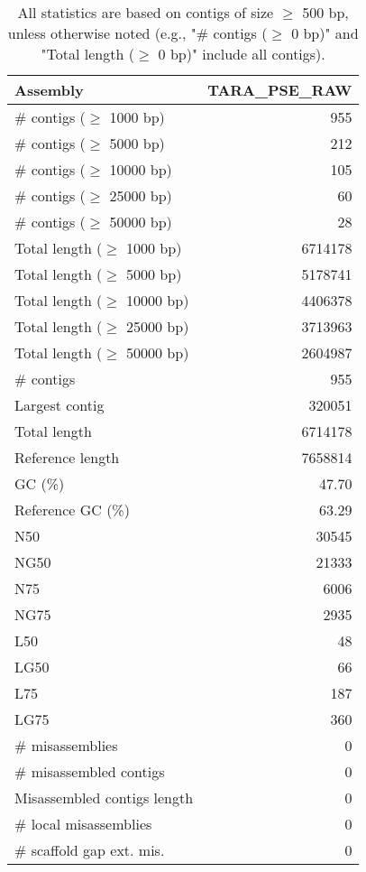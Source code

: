 \documentclass[12pt,a4paper]{article}
\begin{document}
\begin{table}[ht]
\begin{center}
\caption{All statistics are based on contigs of size $\geq$ 500 bp, unless otherwise noted (e.g., "\# contigs ($\geq$ 0 bp)" and "Total length ($\geq$ 0 bp)" include all contigs).}
\begin{tabular}{|l*{1}{|r}|}
\hline
Assembly & TARA\_PSE\_RAW \\ \hline
\# contigs ($\geq$ 1000 bp) & 955 \\ \hline
\# contigs ($\geq$ 5000 bp) & 212 \\ \hline
\# contigs ($\geq$ 10000 bp) & 105 \\ \hline
\# contigs ($\geq$ 25000 bp) & 60 \\ \hline
\# contigs ($\geq$ 50000 bp) & 28 \\ \hline
Total length ($\geq$ 1000 bp) & 6714178 \\ \hline
Total length ($\geq$ 5000 bp) & 5178741 \\ \hline
Total length ($\geq$ 10000 bp) & 4406378 \\ \hline
Total length ($\geq$ 25000 bp) & 3713963 \\ \hline
Total length ($\geq$ 50000 bp) & 2604987 \\ \hline
\# contigs & 955 \\ \hline
Largest contig & 320051 \\ \hline
Total length & 6714178 \\ \hline
Reference length & 7658814 \\ \hline
GC (\%) & 47.70 \\ \hline
Reference GC (\%) & 63.29 \\ \hline
N50 & 30545 \\ \hline
NG50 & 21333 \\ \hline
N75 & 6006 \\ \hline
NG75 & 2935 \\ \hline
L50 & 48 \\ \hline
LG50 & 66 \\ \hline
L75 & 187 \\ \hline
LG75 & 360 \\ \hline
\# misassemblies & 0 \\ \hline
\# misassembled contigs & 0 \\ \hline
Misassembled contigs length & 0 \\ \hline
\# local misassemblies & 0 \\ \hline
\# scaffold gap ext. mis. & 0 \\ \hline

\end{tabular}
\end{center}
\end{table}
\end{document}
